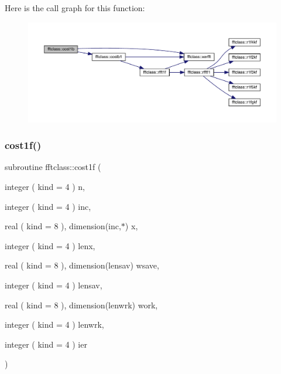 Here is the call graph for this function\+:\nopagebreak
\begin{figure}[H]
\begin{center}
\leavevmode
\includegraphics[width=350pt]{namespacefftclass_a2bdaaab2b5d3130f8339f9463daa6db9_cgraph}
\end{center}
\end{figure}
\mbox{\label{namespacefftclass_ae01eaac3c675ef6c95b60a480bda63ba}} 
\subsubsection{\texorpdfstring{cost1f()}{cost1f()}}
{\footnotesize\ttfamily subroutine fftclass\+::cost1f (\begin{DoxyParamCaption}\item[{integer ( kind = 4 )}]{n,  }\item[{integer ( kind = 4 )}]{inc,  }\item[{real ( kind = 8 ), dimension(inc,$\ast$)}]{x,  }\item[{integer ( kind = 4 )}]{lenx,  }\item[{real ( kind = 8 ), dimension(lensav)}]{wsave,  }\item[{integer ( kind = 4 )}]{lensav,  }\item[{real ( kind = 8 ), dimension(lenwrk)}]{work,  }\item[{integer ( kind = 4 )}]{lenwrk,  }\item[{integer ( kind = 4 )}]{ier }\end{DoxyParamCaption})}

